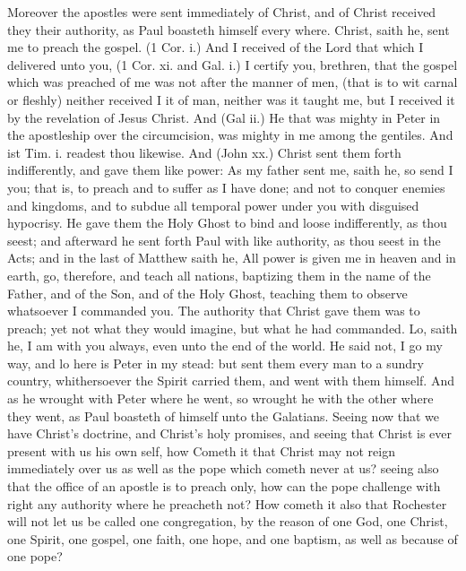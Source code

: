 Moreover the apostles were sent immediately of Christ, 
and of Christ received they their authority, as Paul boasteth 
himself every where. Christ, saith he, sent me to preach 
the gospel. (1 Cor. i.) And I received of the Lord that 
which I delivered unto you, (1 Cor. xi. and Gal. i.) I certify
you, brethren, that the gospel which was preached of 
me was not after the manner of men, (that is to wit carnal
or fleshly) neither received I it of man, neither was 
it taught me, but I received it by the revelation of Jesus 
Christ. And (Gal ii.) He that was mighty in Peter in the 
apostleship over the circumcision, was mighty in me 
among the gentiles. And ist Tim. i. readest thou likewise.
And (John xx.) Christ sent them forth indifferently, 
and gave them like power: As my father sent me, saith he, 
so send I you; that is, to preach and to suffer as I have 
done; and not to conquer enemies and kingdoms, and to subdue
all temporal power under you with disguised hypocrisy. 
He gave them the Holy Ghost to bind and loose indifferently, 
as thou seest; and afterward he sent forth Paul with like 
authority, as thou seest in the Acts; and in the last of Matthew
saith he, All power is given me in heaven and in 
earth, go, therefore, and teach all nations, baptizing them in 
the name of the Father, and of the Son, and of the Holy 
Ghost, teaching them to observe whatsoever I commanded 
you. The authority that Christ gave them was to preach; 
yet not what they would imagine, but what he had commanded.
Lo, saith he, I am with you always, even unto 
the end of the world. He said not, I go my way, and lo here 
is Peter in my stead: but sent them every man to a sundry 
country, whithersoever the Spirit carried them, and went 
with them himself. And as he wrought with Peter where 
he went, so wrought he with the other where they went, 
as Paul boasteth of himself unto the Galatians. Seeing now 
that we have Christ's doctrine, and Christ's holy promises, 
and seeing that Christ is ever present with us his own self, 
how Cometh it that Christ may not reign immediately over 
us as well as the pope which cometh never at us? seeing 
also that the office of an apostle is to preach only, how can 
the pope challenge with right any authority where he 
preacheth not? How cometh it also that Rochester will 
not let us be called one congregation, by the reason of one 
God, one Christ, one Spirit, one gospel, one faith, one 
hope, and one baptism, as well as because of one pope? 

